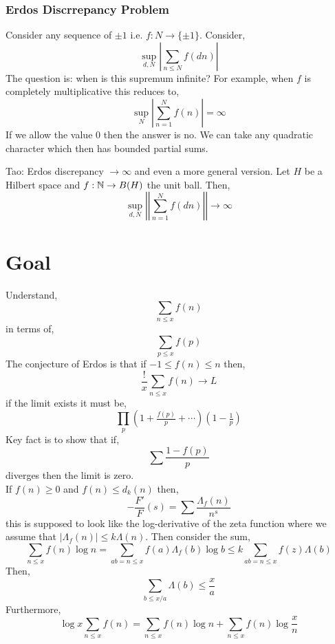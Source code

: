 \documentclass[12pt]{article}
\begin{document}
\subsubsection{Erdos Discrrepancy Problem}

Consider any sequence of $\pm 1$ i.e. $f : N \to \{ \pm 1 \}$. Consider,
\[ \sup_{d,N} \left| \sum_{n \le N} f(dn) \right| \]
The question is: when is this supremum infinite? For example, when $f$ is completely multiplicative this reduces to,
\[ \sup_N \left| \sum_{n = 1}^N f(n) \right| = \infty \]
If we allow the value $0$ then the answer is no. We can take any quadratic character which then has bounded partial sums. 

Tao: Erdos discrepancy $\to \infty$ and even a more general version. Let $H$ be a Hilbert space and $f : \mathbb{N} \to B(H)$ the unit ball. Then,
\[ \sup_{d, N} \left|\left| \sum_{n = 1}^N f(dn) \right|\right| \to \infty \]

\section{Goal}

Understand,
\[ \sum_{n \le x} f(n) \]
in terms of,
\[ \sum_{p \le x} f(p) \]
The conjecture of Erdos is that if $-1 \le f(n) \le n$ then,
\[ \frac{!}{x} \sum_{n \le x} f(n) \to L \]
if the limit exists it must be,
\[ \prod_p (1 + \tfrac{f(p)}{p} + \cdots )(1 - \tfrac{1}{p}) \]
Key fact is to show that if,
\[ \sum \frac{1 - f(p)}{p} \]
diverges then the limit is zero. 
\bigskip\\
If $f(n) \ge 0$ and $f(n) \le d_k(n)$ then,
\[ - \frac{F'}{F}(s) = \sum \frac{\Lambda_f(n)}{n^s} \]
this is supposed to look like the log-derivative of the zeta function where we assume that $|\Lambda_f(n)| \le k \Lambda(n)$. Then consider the sum,
\[ \sum_{n \le x} f(n) \log{n}  = \sum_{ab = n \le x} f(a) \Lambda_f(b) \log{b} \le k \sum_{ab = n \le x} f(z) \Lambda(b) \]
Then,
\[ \sum_{b \le x / a} \Lambda(b) \le \frac{x}{a} \]
Furthermore,
\[ \log{x} \sum_{n \le x} f(n) = \sum_{n \le x} f(n) \log{n} + \sum_{n \le x} f(n) \log{\frac{x}{n}} \]
\end{document}
